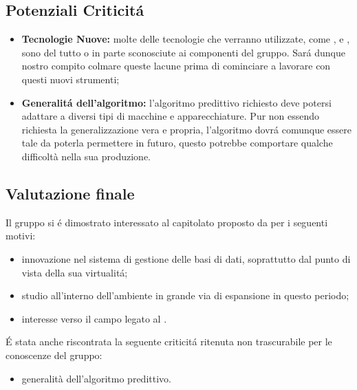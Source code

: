 \subsection{Potenziali Criticit\'a}

\begin{itemize}
	\item \textbf{Tecnologie Nuove:} molte delle tecnologie che verranno utilizzate, come ,  e , sono del tutto o in parte sconosciute ai componenti del gruppo. Sar\'a dunque nostro compito colmare queste lacune prima di cominciare a lavorare con questi nuovi strumenti;
\end{itemize}

\begin{itemize}
	\item \textbf{Generalit\'a dell'algoritmo:} l'algoritmo predittivo richiesto deve potersi adattare a diversi tipi di macchine e apparecchiature. Pur non essendo richiesta la generalizzazione vera e propria, l'algoritmo dovr\'a comunque essere tale da poterla permettere in futuro, questo potrebbe comportare qualche difficoltà nella sua produzione.
\end{itemize}

\subsection{Valutazione finale}
Il gruppo si \'e dimostrato interessato al capitolato proposto da \Proponente{} per i seguenti motivi:
\begin{itemize}
	\item innovazione nel sistema di gestione delle basi di dati, soprattutto dal punto di vista della sua virtualit\'a;
	\item studio all'interno dell'ambiente  in grande via di espansione in questo periodo;
	\item interesse verso il campo legato al .
\end{itemize}

\'E stata anche riscontrata la seguente criticit\'a ritenuta non trascurabile per le conoscenze del gruppo:

\begin{itemize}
	\item generalità dell'algoritmo predittivo.
\end{itemize}

